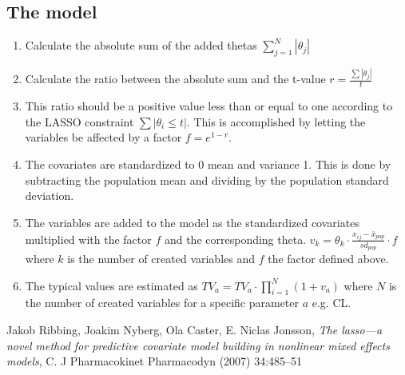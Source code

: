 \subsection{The model}
\begin{enumerate}
    \item Calculate the absolute sum of the added thetas $\sum_{j=1}^N |\theta_j|$ 
    \item Calculate the ratio between the absolute sum and the t-value $r = \frac{\sum{|\theta_j|}}{t}$
    \item This ratio should be a positive value less than or equal to one according to the LASSO constraint $\sum{|\theta_i \le t|}$. This is accomplished by letting the variables be affected by a factor $f=e^{1-r}$.
    \item The covariates are standardized to 0 mean and variance 1. This is done by subtracting the population mean and dividing by the population standard deviation.
    \item The variables are added to the model as the standardized covariates multiplied with the factor $f$ and the corresponding theta. $v_k = \theta_k \cdot \frac{x_{ij} - \bar{x}_{pop}}{sd_{pop}} \cdot f$ where $k$ is the number of created variables and $f$ the factor defined above.
    \item The typical values are estimated as $TV_a = TV_a \cdot \prod_{i=1}^N ( 1+v_a)$ where $N$ is the number of created variables for a specific parameter $a$ e.g. CL.
\end{enumerate}



\begin{thebibliography}{1}
 Jakob Ribbing, Joakim Nyberg, Ola Caster, E. Niclas Jonsson, {\em The lasso—a novel method for predictive covariate model building in nonlinear mixed effects models}, C. J Pharmacokinet Pharmacodyn (2007) 34:485–51
\end{thebibliography}



